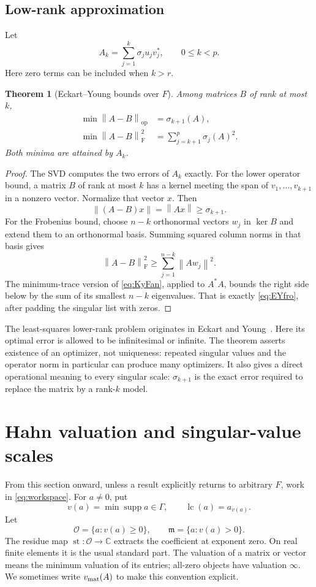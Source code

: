 \documentclass[11pt,a4paper]{article}
\numberwithin{equation}{section}
\newtheorem{theorem}{Theorem}[section]
\theoremstyle{definition}
\theoremstyle{remark}
\newcommand{\C}{\mathbb C}
\newcommand{\OO}{\mathcal O}
\newcommand{\mm}{\mathfrak m}
\newcommand{\supp}{\operatorname{supp}}
\newcommand{\st}{\operatorname{st}}
\newcommand{\lc}{\operatorname{lc}}
\newcommand{\op}{\mathrm{op}}
\newcommand{\Fr}{\mathrm F}
\newcommand{\norm}[1]{\left\lVert#1\right\rVert}
\begin{document}
\subsection{Low-rank approximation}
Let
\[
 A_k=\sum_{j=1}^k\sigma_j u_jv_j^*,\qquad 0\le k<p.
\]
Here zero terms can be included when $k>r$.

\begin{theorem}[Eckart--Young bounds over $F$]\label{thm:EY}
Among matrices $B$ of rank at most $k$,
\begin{align}
 \min\norm{A-B}_{\op}&=\sigma_{k+1}(A),\label{eq:EYop}\\
 \min\norm{A-B}_{\Fr}^2&=\sum_{j=k+1}^p\sigma_j(A)^2.\label{eq:EYfro}
\end{align}
Both minima are attained by $A_k$.
\end{theorem}
\begin{proof}
The SVD computes the two errors of $A_k$ exactly. For the lower operator
bound, a matrix $B$ of rank at most $k$ has a kernel meeting the span of
$v_1,\ldots,v_{k+1}$ in a nonzero vector. Normalize that vector $x$. Then
\[
 \norm{(A-B)x}=\norm{Ax}\ge\sigma_{k+1}.
\]
For the Frobenius bound, choose $n-k$ orthonormal vectors $w_j$ in $\ker B$
and extend them to an orthonormal basis. Summing squared column norms in
that basis gives
\[
 \norm{A-B}_{\Fr}^2\ge\sum_{j=1}^{n-k}\norm{Aw_j}^2.
\]
The minimum-trace version of \eqref{eq:KyFan}, applied to $A^*A$, bounds
the right side below by the sum of its smallest $n-k$ eigenvalues. That is
exactly \eqref{eq:EYfro}, after padding the singular list with zeros.
\end{proof}

The least-squares lower-rank problem originates in Eckart and
Young~\cite{EY}. Here its optimal error is allowed to be infinitesimal or
infinite. The theorem asserts existence of an optimizer, not uniqueness:
repeated singular values and the operator norm in particular can produce
many optimizers. It also gives a direct operational meaning to every
singular scale: $\sigma_{k+1}$ is the exact error required to replace the
matrix by a rank-$k$ model.

\section{Hahn valuation and singular-value scales}\label{sec:valuation}

From this section onward, unless a result explicitly returns to arbitrary
$F$, work in \eqref{eq:workspace}. For $a\ne0$, put
\[
 v(a)=\min\supp a\in\Gamma,\qquad
 \lc(a)=a_{v(a)}.
\]
Let
\[
 \OO=\{a:v(a)\ge0\},\qquad \mm=\{a:v(a)>0\}.
\]
The residue map $\st:\OO\to\C$ extracts the coefficient at exponent zero.
On real finite elements it is the usual standard part. The valuation of a
matrix or vector means the minimum valuation of its entries; all-zero
objects have valuation $\infty$. We sometimes write $v_{\rm mat}(A)$ to
make this convention explicit.
\end{document}
